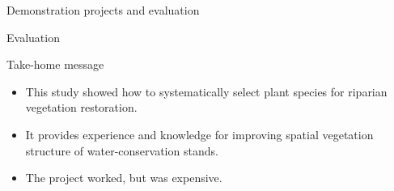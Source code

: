 \begin{frame}{Demonstration projects and evaluation}
{\begin{exampleblock}{Evaluation}
\end{exampleblock}
}

\end{frame}


\begin{frame}{Take-home message}
  \begin{itemize}
\item  This study showed how to systematically select plant species for riparian vegetation restoration.
\item  It provides experience and knowledge for improving spatial vegetation structure of water-conservation stands.
\item  The project worked, but was expensive.
  \end{itemize}
\end{frame}